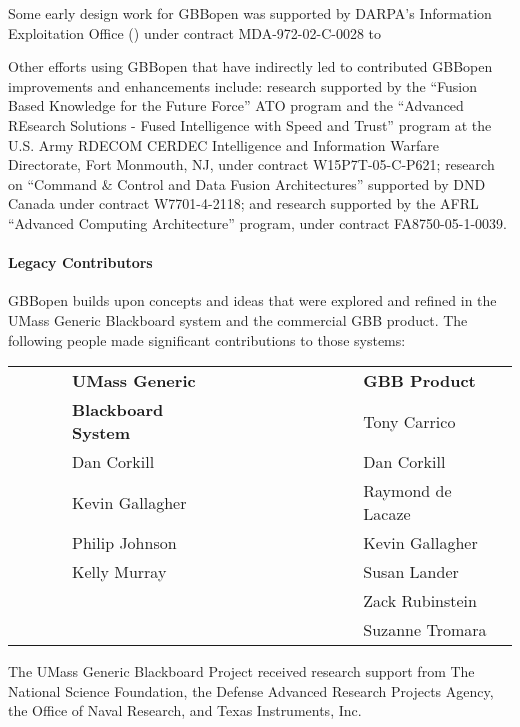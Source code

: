 Some early design work for GBBopen was supported by DARPA's Information
Exploitation Office () under
contract MDA-972-02-C-0028 to 

Other efforts using GBBopen that have indirectly led to contributed GBBopen
improvements and enhancements include: research supported by the ``Fusion
Based Knowledge for the Future Force'' ATO program and the ``Advanced REsearch
Solutions - Fused Intelligence with Speed and Trust'' program at the U.S. Army
RDECOM CERDEC Intelligence and Information Warfare Directorate, Fort Monmouth,
NJ, under contract W15P7T-05-C-P621; research on ``Command \& Control and Data
Fusion Architectures'' supported by DND Canada under contract W7701-4-2118;
and research supported by the AFRL ``Advanced Computing Architecture''
program, under contract FA8750-05-1-0039.

\paragraph{Legacy  Contributors}

GBBopen builds upon concepts and ideas that were explored and refined in the
UMass Generic Blackboard system and the commercial GBB product.  The following
people made significant contributions to those systems:

\begin{tabular}{llll}
  ~~~~~& \textbf{UMass Generic} & ~~~~~~~~~~~~~ & \textbf{GBB Product}\\
  & \textbf{Blackboard System} & & Tony Carrico \\  
  & Dan Corkill & & Dan Corkill \\
  & Kevin Gallagher & & Raymond de Lacaze\\
  & Philip Johnson & & Kevin Gallagher\\
  & Kelly Murray & & Susan Lander \\
  & & & Zack Rubinstein\\
  & & & Suzanne Tromara\\
\end{tabular}

The UMass Generic Blackboard Project received research support from The
National Science Foundation, the Defense Advanced Research Projects Agency,
the Office of Naval Research, and Texas Instruments, Inc.

